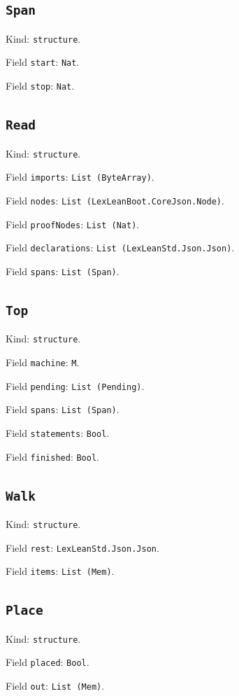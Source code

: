 \documentclass[11pt]{article}
\begin{document}
\subsection*{\texttt{Span}}
\noindent Kind: \texttt{structure}.\par
\noindent Field \texttt{start}: \texttt{Nat}.\par
\noindent Field \texttt{stop}: \texttt{Nat}.\par
\subsection*{\texttt{Read}}
\noindent Kind: \texttt{structure}.\par
\noindent Field \texttt{imports}: \texttt{List (ByteArray)}.\par
\noindent Field \texttt{nodes}: \texttt{List (LexLeanBoot.CoreJson.Node)}.\par
\noindent Field \texttt{proofNodes}: \texttt{List (Nat)}.\par
\noindent Field \texttt{declarations}: \texttt{List (LexLeanStd.Json.Json)}.\par
\noindent Field \texttt{spans}: \texttt{List (Span)}.\par
\subsection*{\texttt{Top}}
\noindent Kind: \texttt{structure}.\par
\noindent Field \texttt{machine}: \texttt{M}.\par
\noindent Field \texttt{pending}: \texttt{List (Pending)}.\par
\noindent Field \texttt{spans}: \texttt{List (Span)}.\par
\noindent Field \texttt{statements}: \texttt{Bool}.\par
\noindent Field \texttt{finished}: \texttt{Bool}.\par
\subsection*{\texttt{Walk}}
\noindent Kind: \texttt{structure}.\par
\noindent Field \texttt{rest}: \texttt{LexLeanStd.Json.Json}.\par
\noindent Field \texttt{items}: \texttt{List (Mem)}.\par
\subsection*{\texttt{Place}}
\noindent Kind: \texttt{structure}.\par
\noindent Field \texttt{placed}: \texttt{Bool}.\par
\noindent Field \texttt{out}: \texttt{List (Mem)}.\par
\end{document}
